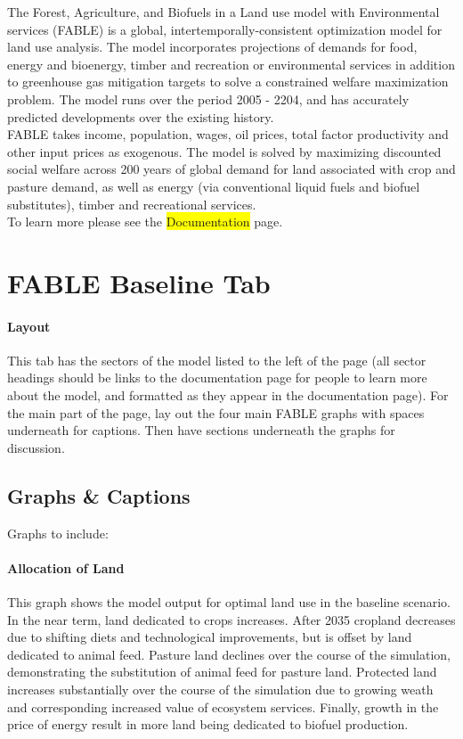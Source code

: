 \documentclass[10pt]{article}
\newcommand{\hilight}[1]{\colorbox{yellow}{#1}}
\begin{document}
The Forest, Agriculture, and Biofuels in a Land use model with Environmental services (FABLE) is a global, intertemporally-consistent optimization model for land use analysis. The model incorporates projections of demands for food, energy and bioenergy, timber and recreation or environmental services in addition to greenhouse gas mitigation targets to solve a constrained welfare maximization problem. The model runs over the period 2005 - 2204, and has accurately predicted developments over the existing history. \\
FABLE takes income, population, wages, oil prices, total factor productivity and other input prices as exogenous. The model is solved by maximizing discounted social welfare across 200 years of global demand for land associated with crop and pasture demand, as well as energy (via conventional liquid fuels and biofuel substitutes), timber and recreational services. \\
To learn more please see the \hilight{Documentation} page.



\section{FABLE Baseline Tab}
\paragraph{Layout}
This tab has the sectors of the model listed to the left of the page (all sector headings should be links to the documentation page for people to learn more about the model, and formatted as they appear in the documentation page). For the main part of the page, lay out the four main FABLE graphs with spaces underneath for captions. Then have sections underneath the graphs for discussion. 

\subsection{Graphs \& Captions}
Graphs to include:
\paragraph{Allocation of Land} This graph shows the model output for optimal land use in the baseline scenario. In the near term, land dedicated to crops increases. After 2035 cropland decreases due to shifting diets and technological improvements, but is offset by land dedicated to animal feed. Pasture land declines over the course of the simulation, demonstrating the substitution of animal feed for pasture land. Protected land increases substantially over the course of the simulation due to growing weath and corresponding increased value of ecosystem services. Finally, growth in the price of energy result in more land being dedicated to biofuel production. 
\end{document}
